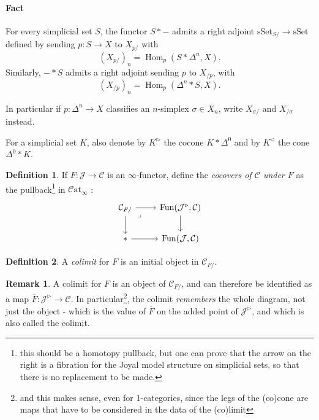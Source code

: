 \documentclass[11pt]{article}
\theoremstyle{definition}
\newtheorem{definition}{Definition}
\newtheorem{remark}{Remark}
\newcommand{\sSet}{\mathrm{sSet}}
\newcommand{\Catinf}{\mathcal{C}\mathrm{at}_{\infty}}
\DeclareMathOperator{\Hom}{Hom}
\DeclareMathOperator{\Fun}{Fun}
\newcommand{\C}{\mathcal{C}}
\newcommand{\J}{\mathcal{J}}
\begin{document}
\paragraph{Fact} For every simplicial set $S$, the functor $S \ast -$ admits a right adjoint $\sSet_{S/} \to \sSet$ defined by sending $p : S \to X$ to $X_{p/}$ with
$$(X_{p/})_n = \Hom_p(S \ast \Delta^n, X).$$
Similarly, $- \ast S$ admits a right adjoint sending $p$ to $X_{/p}$, with
$$(X_{/p})_n = \Hom_p(\Delta^n \ast S, X).$$

In particular if $p : \Delta^n \to X$ classifies an $n$-simplex $\sigma \in X_n$, write $X_{\sigma/}$ and $X_{/\sigma}$ instead.

For a simplicial set $K$, also denote by $K^{\triangleright}$ the cocone $K \ast \Delta^0$ and by $K^{\triangleleft}$ the cone $\Delta^0 \ast K$.

\begin{definition}
    If $F : \J \to \C$ is an $\infty$-functor, define the \emph{cocovers of $\C$ under $F$} as the pullback\footnote{this should be a homotopy pullback, but one can prove that the arrow on the right is a fibration for the Joyal model structure on simplicial sets, so that there is no replacement to be made.} in $\Catinf$ :
    \[\begin{tikzcd}
        {\C_{F/}} & {\Fun(\J^{\triangleright}, \C)} \\
        \ast & {\Fun(\J, \C)}
        \arrow[from=1-1, to=1-2]
        \arrow[from=1-1, to=2-1]
        \arrow["\lrcorner"{anchor=center, pos=0.125}, draw=none, from=1-1, to=2-2]
        \arrow[from=1-2, to=2-2]
        \arrow[from=2-1, to=2-2]
    \end{tikzcd}\]
\end{definition}

\begin{definition}
    A \emph{colimit} for $F$ is an initial object in $\C_{F/}$.
\end{definition}

\begin{remark}
    A colimit for $F$ is an object of $\C_{F/}$, and can therefore be identified as a map $\overline{F} : \J^{\triangleright} \to \C$. In particular\footnote{and this makes sense, even for 1-categories, since the legs of the (co)cone are maps that have to be considered in the data of the (co)limit}, the colimit \emph{remembers} the whole diagram, not just the object - which is the value of $\overline{F}$ on the added point of $\J^{\triangleright}$, and which is also called the colimit.
\end{remark}
\end{document}

